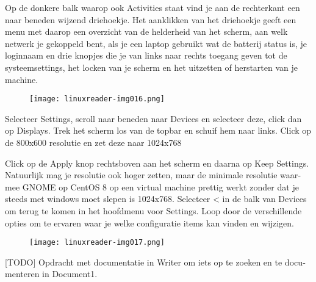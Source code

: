 Op de donkere balk waarop ook Activities staat vind je aan de rechterkant een naar beneden wijzend driehoekje. Het
aanklikken van het driehoekje geeft een menu met daarop een overzicht van de helderheid van het scherm, aan welk
netwerk je gekoppeld bent, als je een laptop gebruikt wat de batterij status is, je loginnaam en drie knopjes die je
van links naar rechts toegang geven tot de systeemsettings, het locken van je scherm en het uitzetten of herstarten van
je machine.



\begin{figure}[H]
\texttt{[image: linuxreader-img016.png]}
\end{figure}
{
Selecteer Settings, scroll naar beneden naar Devices en selecteer deze, click dan op Displays. Trek het scherm los van
de topbar en schuif hem naar links. Click op de 800x600 resolutie en zet deze naar 1024x768}

{
\foreignlanguage{dutch}{Click op de Apply knop rechtsboven aan het scherm en daarna op Keep Settings. Natuurlijk mag je
resolutie ook hoger zetten, maar de minimale resolutie waarmee GNOME op CentOS 8 op een virtual machine prettig werkt
zonder dat je steeds met windows moet slepen is 1024x768. Selecteer {\textless} in de balk van Devices om terug te
komen in het hoofdmenu voor Settings. Loop door de verschillende opties om te ervaren waar je welke configuratie items
kan vinden en wijzigen.}}

\begin{figure}[H]
\texttt{[image: linuxreader-img017.png]}
\end{figure}
{
\foreignlanguage{dutch}{[TODO] Opdracht met documentatie in Writer om iets op te zoeken en te documenteren in Document1.
}}

